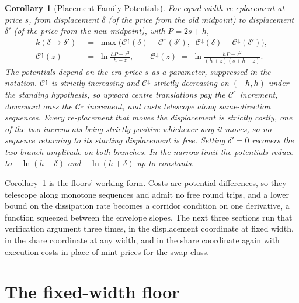 \documentclass[11pt,a4paper]{article}
\theoremstyle{definition}
\theoremstyle{plain}
\newtheorem{corollary}{Corollary}
\theoremstyle{remark}
\begin{document}
\begin{corollary}[Placement-Family Potentials]\label{cor:family}
For equal-width re-eplacement at price $s$, from displacement $\delta$ (of the price from the old midpoint) to displacement $\delta'$ (of the price from the new midpoint), with $P = 2s + h$,
\begin{align}
k(\delta \to \delta') \;&=\; \max\!\Big(
\mathcal{C}^{\uparrow}(\delta) - \mathcal{C}^{\uparrow}(\delta'),
\;\; \mathcal{C}^{\downarrow}(\delta) -
\mathcal{C}^{\downarrow}(\delta') \Big),
\label{eq:potentials} \\[4pt]
\mathcal{C}^{\uparrow}(z) \;&=\; \ln \frac{hP - z^2}{h - z}, \qquad
\mathcal{C}^{\downarrow}(z) \;=\; \ln \frac{hP - z^2}{(h + z)(s +
h - z)} . \label{eq:cupcdn}
\end{align}
The potentials depend on the era price $s$ as a parameter, suppressed in the notation. $\mathcal{C}^{\uparrow}$ is strictly increasing and $\mathcal{C}^{\downarrow}$ strictly decreasing on $(-h, h)$ under
the standing hypothesis, so upward centre translations pay the $\mathcal{C}^{\uparrow}$ increment, downward ones the $\mathcal{C}^{\downarrow}$ increment, and costs telescope along same-direction sequences. 
Every re-placement that moves the displacement is strictly costly, one of the two increments being strictly positive whichever way it moves, so no sequence returning to its starting displacement is free. 
Setting $\delta' = 0$ recovers the two-branch amplitude on both branches. In the narrow limit the potentials reduce to $-\ln(h - \delta)$ and $-\ln(h + \delta)$ up to constants.
\end{corollary}

Corollary~\ref{cor:family} is the floors' working form. Costs are potential differences, so they telescope along monotone sequences and admit no free round trips, and a lower bound on the dissipation 
rate becomes a corridor condition on one derivative, a function squeezed between the envelope slopes. The next three sections run that verification argument three times, in the displacement coordinate 
at fixed width, in the share coordinate at any width, and in the share coordinate again with execution costs in place of mint prices for the swap class.

\section{The fixed-width floor}\label{sec:fixed}
\end{document}

